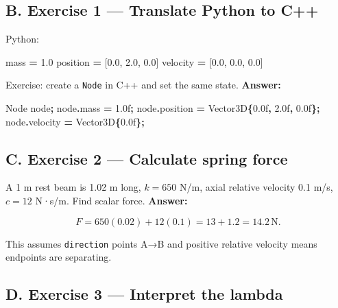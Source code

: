 \documentclass[
  10pt,
  a4paper,
]{article}
\newenvironment{Shaded}{\begin{snugshade}}{\end{snugshade}}
\newcommand{\BuiltInTok}[1]{#1}
\newcommand{\FloatTok}[1]{\textcolor[rgb]{0.00,0.00,0.81}{#1}}
\newcommand{\NormalTok}[1]{#1}
\newcommand{\OperatorTok}[1]{\textcolor[rgb]{0.81,0.36,0.00}{\textbf{#1}}}
\begin{document}
\subsection{B. Exercise 1 --- Translate Python to
C++}\label{b.-exercise-1-translate-python-to-c}

Python:

\begin{Shaded}
\begin{Highlighting}[]
\NormalTok{mass }\OperatorTok{=} \FloatTok{1.0}
\NormalTok{position }\OperatorTok{=}\NormalTok{ [}\FloatTok{0.0}\NormalTok{, }\FloatTok{2.0}\NormalTok{, }\FloatTok{0.0}\NormalTok{]}
\NormalTok{velocity }\OperatorTok{=}\NormalTok{ [}\FloatTok{0.0}\NormalTok{, }\FloatTok{0.0}\NormalTok{, }\FloatTok{0.0}\NormalTok{]}
\end{Highlighting}
\end{Shaded}

Exercise: create a \texttt{Node} in C++ and set the same state.
\textbf{Answer:}

\begin{Shaded}
\begin{Highlighting}[]
\NormalTok{Node node}\OperatorTok{;}
\NormalTok{node}\OperatorTok{.}\NormalTok{mass }\OperatorTok{=} \FloatTok{1.0}\BuiltInTok{f}\OperatorTok{;}
\NormalTok{node}\OperatorTok{.}\NormalTok{position }\OperatorTok{=}\NormalTok{ Vector3D}\OperatorTok{\{}\FloatTok{0.0}\BuiltInTok{f}\OperatorTok{,} \FloatTok{2.0}\BuiltInTok{f}\OperatorTok{,} \FloatTok{0.0}\BuiltInTok{f}\OperatorTok{\};}
\NormalTok{node}\OperatorTok{.}\NormalTok{velocity }\OperatorTok{=}\NormalTok{ Vector3D}\OperatorTok{\{}\FloatTok{0.0}\BuiltInTok{f}\OperatorTok{\};}
\end{Highlighting}
\end{Shaded}

\subsection{C. Exercise 2 --- Calculate spring
force}\label{c.-exercise-2-calculate-spring-force}

A 1 m rest beam is 1.02 m long, \(k=650\) N/m, axial relative velocity
0.1 m/s, \(c=12\) N·s/m. Find scalar force. \textbf{Answer:}

\[F=650(0.02)+12(0.1)=13+1.2=14.2\,\mathrm N.\]

This assumes \texttt{direction} points A→B and positive relative
velocity means endpoints are separating.

\subsection{D. Exercise 3 --- Interpret the
lambda}\label{d.-exercise-3-interpret-the-lambda}
\end{document}
